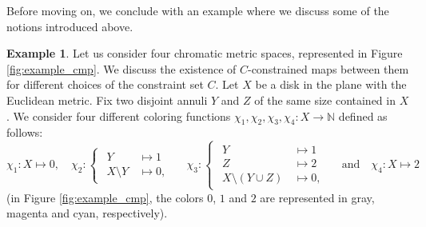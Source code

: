 \documentclass[8pt,a4paper,oneside,english,english]{article}
\theoremstyle{plain}
\theoremstyle
{plain}
\theoremstyle{definition}
\newtheorem{example}[theorem]{Example}%
\newcommand{\N}{\mathbb{N}}
\begin{document}
Before moving on, we conclude with an example where we discuss some of the notions introduced above.
\begin{example}\label{ex:examples_of_C-constrained_maps}
Let us consider four chromatic metric spaces, represented in Figure \ref{fig:example_cmp}. We discuss the existence of $C$-constrained maps between them for different choices of the constraint set $C$. Let $X$ be a disk in the plane with the Euclidean metric. Fix two disjoint annuli $Y$ and $Z$ of the same size contained in $X$. We consider four different coloring functions $\chi_1,\chi_2,\chi_3,\chi_4\colon X\to\N$ defined as follows: 
\[
\chi_1\colon X\mapsto 0,\quad\chi_2\colon\begin{cases}
    \begin{aligned}  Y\,&\mapsto 1\\
    X\setminus Y\,&\mapsto 0,
    \end{aligned}
\end{cases}\quad\chi_3\colon \begin{cases}\begin{aligned}  Y\,&\mapsto 1\\
Z\,&\mapsto 2\\
     X\setminus (Y\cup Z)\,&\mapsto 0,
    \end{aligned}\end{cases} \quad \text{and}\quad \chi_4\colon X\mapsto 2
\]
(in Figure \ref{fig:example_cmp}, the colors $0$, $1$ and $2$ are represented in gray, magenta and cyan, respectively).
    \begin{figure}[h!]
    \centering
    \begin{subfigure}{0.245\textwidth}
    \end{subfigure}    
        \begin{subfigure}{0.245\textwidth}

\end{subfigure}
\end{figure}
\end{example}
\end{document}
